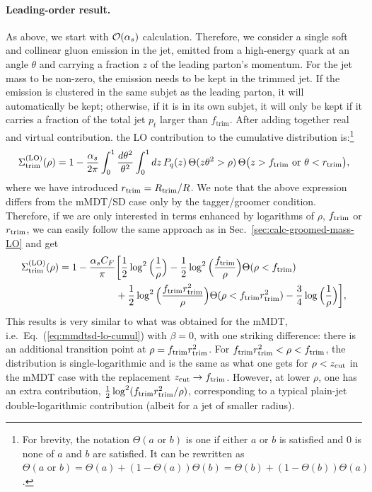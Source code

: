 \paragraph{Leading-order result.} As above, we start with
${\cal O}(\alpha_s)$ calculation. Therefore, we consider a single soft
and collinear gluon emission in the jet, emitted from a high-energy
quark at an angle $\theta$ and carrying a fraction $z$ of the leading
parton's momentum.
%
For the jet mass to be non-zero, the emission needs to be kept in the
trimmed jet. 
%
If the emission is clustered in the same subjet as the leading parton,
it will automatically be kept; otherwise, if it is in its own subjet,
it will only be kept if it carries a fraction of the total jet $p_t$
larger than $f_\text{trim}$. After adding together real and virtual
contribution. the LO contribution to the cumulative distribution
is:\footnote{For brevity, the notation $\Theta(a\text{ or }b)$ is one
  if either $a$ or $b$ is satisfied and 0 is none of $a$ and $b$ are
  satisfied. It can be rewritten as
  $\Theta(a\text{ or
  }b)=\Theta(a)+(1-\Theta(a))\Theta(b)=\Theta(b)+(1-\Theta(b))\Theta(a)$.}
\begin{equation}\label{eq:trim-lo-full}
  \Sigma^{\text{(LO)}}_{\text{trim}}(\rho)
  = 1-\frac{\alpha_s}{2\pi} \int_0^1\frac{d\theta^2}{\theta^2}\int_0^1dz\,P_q(z)
  \,\Theta(z\theta^2>\rho)\,\Theta\big(z>f_{\text{trim}}\text{ or }\theta<r_{\text{trim}}\big),
\end{equation}
where we have introduced $r_{\text{trim}}=R_{\text{trim}}/R$.
We note that the above expression  differs from the mMDT/SD case only by the tagger/groomer condition.
%
Therefore, if we are only interested in terms enhanced by logarithms of $\rho$,
$f_{\text{trim}}$ or $r_{\text{trim}}$, we can easily follow the same approach as in
Sec.~\ref{sec:calc-groomed-mass-LO} and get
%
\begin{align} \label{eq:trim-LO-result-cumulative}
 \Sigma_{\text{trim}}^{\text{(LO)}}(\rho)
  = 1- \frac{\alpha_sC_F}{\pi}
  &\bigg[\frac{1}{2}\log^2\Big(\frac{1}{\rho}\Big)-\frac{1}{2}\log^2\Big(\frac{f_{\text{trim}}}{\rho}\Big)\Theta(\rho<f_{\text{trim}})\\
  &+\frac{1}{2}\log^2\Big(\frac{f_{\text{trim}}r_{\text{trim}}^2}{\rho}\Big)\Theta(\rho<f_{\text{trim}}r_{\text{trim}}^2)-\frac{3}{4}\log\Big(\frac{1}{\rho}\Big)\bigg],\nonumber
\end{align}
This results is very similar to what was obtained for the mMDT, i.e.\
Eq.~(\ref{eq:mmdtsd-lo-cumul}) with $\beta=0$, with one striking
difference: there is an additional transition point at
$\rho=f_{\text{trim}}r_{\text{trim}}^2$.
%
For $f_{\text{trim}}r_{\text{trim}}^2<\rho<f_{\text{trim}}$, the distribution is
single-logarithmic and is the same as what one gets for $\rho<z_{\text{cut}}$
in the mMDT case with the replacement $z_{\text{cut}}\to f_{\text{trim}}$. However, at lower
$\rho$, one has an extra contribution,
$\frac{1}{2}\log^2(f_{\text{trim}}r_{\text{trim}}^2/\rho)$, corresponding to a typical
plain-jet double-logarithmic contribution (albeit for a jet of
smaller radius).

